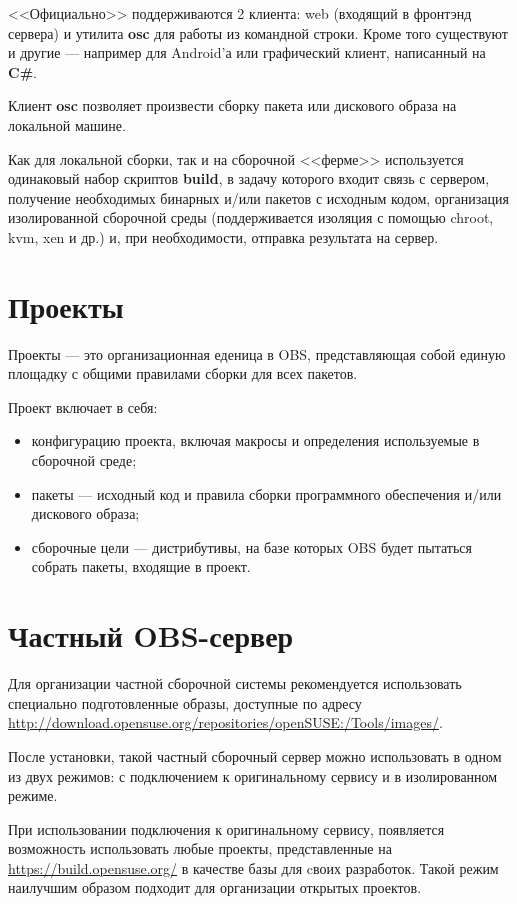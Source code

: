 \documentclass[10pt, a5paper]{article}
\begin{document}
<<Официально>> поддерживаются 2 клиента: web (входящий в фронтэнд сервера) и утилита \textbf{osc} для работы из командной строки. Кроме того существуют и другие --- например для Android'а или графический клиент, написанный на \textbf{C\#}.

Клиент \textbf{osc} позволяет произвести сборку пакета или дискового образа на локальной машине.

Как для локальной сборки, так и на сборочной <<ферме>> используется одинаковый набор скриптов \textbf{build}, в задачу которого входит связь с сервером, получение необходимых бинарных и/или пакетов с исходным кодом, организация изолированной сборочной среды (поддерживается изоляция с помощью chroot, kvm, xen и др.) и, при необходимости, отправка результата на сервер.

\section*{Проекты}

Проекты --- это организационная еденица в OBS, представляющая собой единую площадку с общими правилами сборки для всех пакетов.

Проект включает в себя:

\begin{itemize}
  \item конфигурацию проекта, включая макросы и определения используемые в сборочной среде;
  \item пакеты --- исходный код и правила сборки программного обеспечения и/или дискового образа;
  \item сборочные цели --- дистрибутивы, на базе которых OBS будет пытаться собрать пакеты,  входящие в проект.
\end{itemize}

\section*{Частный OBS-сервер}

Для организации частной сборочной системы рекомендуется \cite{Pynkin2} использовать специально подготовленные образы, доступные по адресу \url{http://download.opensuse.org/repositories/openSUSE:/Tools/images/}.

После установки, такой частный сборочный сервер можно использовать в одном из двух режимов: с подключением к оригинальному сервису и в изолированном режиме.

При использовании подключения к оригинальному сервису, появляется возможность использовать любые проекты, представленные на \url{https://build.opensuse.org/} в качестве базы для cвоих разработок. Такой режим наилучшим образом подходит для организации открытых проектов.
\end{document}
